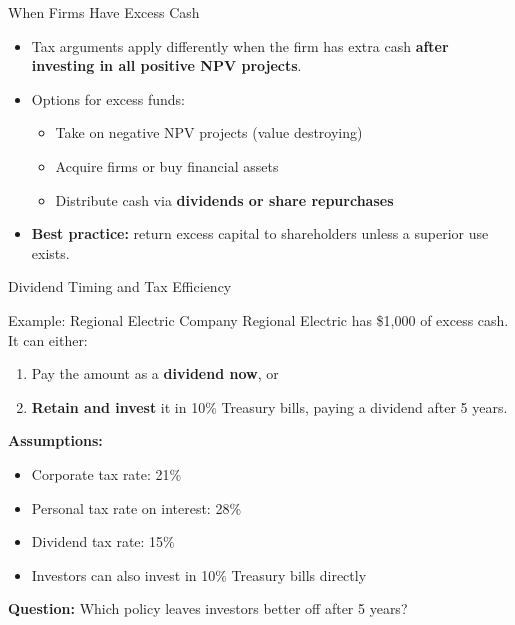 \begin{frame}{When Firms Have Excess Cash}
    \begin{itemize}
        \item Tax arguments apply differently when the firm has extra cash \textbf{after investing in all positive NPV projects}.
        \item Options for excess funds:
        \begin{itemize}
            \item Take on negative NPV projects (value destroying)
            \item Acquire firms or buy financial assets
            \item Distribute cash via \textbf{dividends or share repurchases}
        \end{itemize}
        \item \textbf{Best practice:} return excess capital to shareholders unless a superior use exists.
    \end{itemize}
\end{frame}
\begin{frame}{Dividend Timing and Tax Efficiency}
    \begin{block}{Example: Regional Electric Company}
        Regional Electric has \$1,000 of excess cash. It can either:
        \begin{enumerate}
            \item Pay the amount as a \textbf{dividend now}, or
            \item \textbf{Retain and invest} it in 10\% Treasury bills, paying a dividend after 5 years.
        \end{enumerate}
        \vspace{0.2cm}
        \textbf{Assumptions:}
        \begin{itemize}
            \item Corporate tax rate: 21\%
            \item Personal tax rate on interest: 28\%
            \item Dividend tax rate: 15\%
            \item Investors can also invest in 10\% Treasury bills directly
        \end{itemize}
        \textbf{Question:} Which policy leaves investors better off after 5 years?
    \end{block}
\end{frame}
